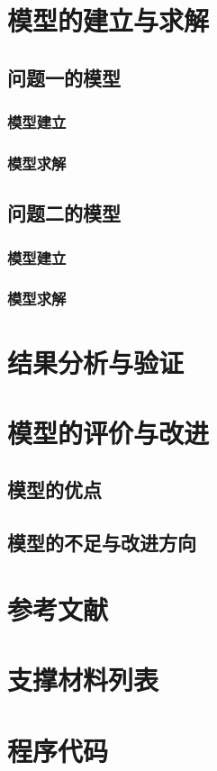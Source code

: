 \documentclass[12pt,a4paper]{article}
\begin{document}

\section{模型的建立与求解}
\subsection{问题一的模型}
\subsubsection{模型建立}
\subsubsection{模型求解}
\subsection{问题二的模型}
\subsubsection{模型建立}
\subsubsection{模型求解}

\section{结果分析与验证}

\section{模型的评价与改进}
\subsection{模型的优点}
\subsection{模型的不足与改进方向}

\section*{参考文献}

\newpage
\appendix
{}
\section{支撑材料列表}
\section{程序代码}
\end{document}
